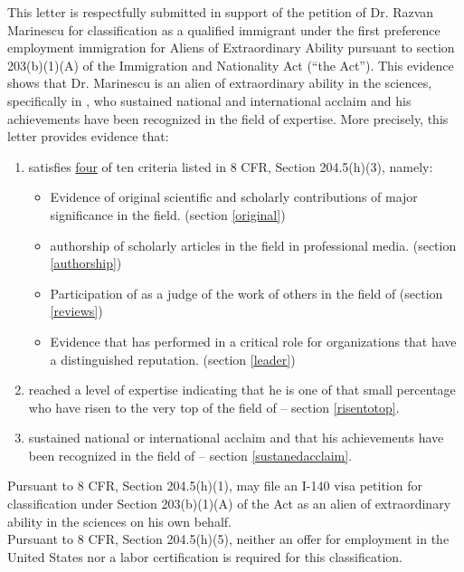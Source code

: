 \documentclass[11pt]{article}
\begin{document}
This letter is respectfully submitted in support of the petition of Dr. Razvan Marinescu for classification as a qualified immigrant under the first preference employment immigration for Aliens of Extraordinary Ability pursuant to section 203(b)(1)(A) of the Immigration and Nationality Act (“the Act”). This evidence shows that Dr. Marinescu is an alien of extraordinary ability in the sciences, specifically in \underline{\fie{}}, who sustained national and international acclaim and his achievements have been recognized in the field of expertise. More precisely, this letter provides evidence that:
\begin{enumerate}
 \item \dr satisfies \underline{four}  of ten criteria listed in 8
CFR, Section 204.5(h)(3), namely:
\begin{itemize}
 \item Evidence of \drs original scientific and scholarly contributions of major
significance in the field. (section \ref{original})
 \item \drs authorship of scholarly articles in the field in professional media. (section \ref{authorship})
 \item Participation of \dr as a judge of the work of others in the field of
\fie{} (section \ref{reviews})
 \item Evidence that \dr has performed in a critical role for organizations that have a
distinguished reputation. (section \ref{leader})
\end{itemize}
 \item \dr reached a level of expertise indicating that he is one of that small percentage who have risen to the very top of the field of \fie{} -- section \ref{risentotop}.
 \item \dr sustained national or international acclaim and that his achievements have been recognized in the field of \fie{} -- section \ref{sustanedacclaim}.
\end{enumerate}


Pursuant to 8 CFR, Section 204.5(h)(1), \dr may file an I-140 visa petition for classification under Section 203(b)(1)(A) of the Act as an alien of extraordinary ability in the sciences on his own behalf.\\

Pursuant to 8 CFR, Section 204.5(h)(5), neither an offer for employment in the United States nor a labor certification is required for this classification.
\end{document}
